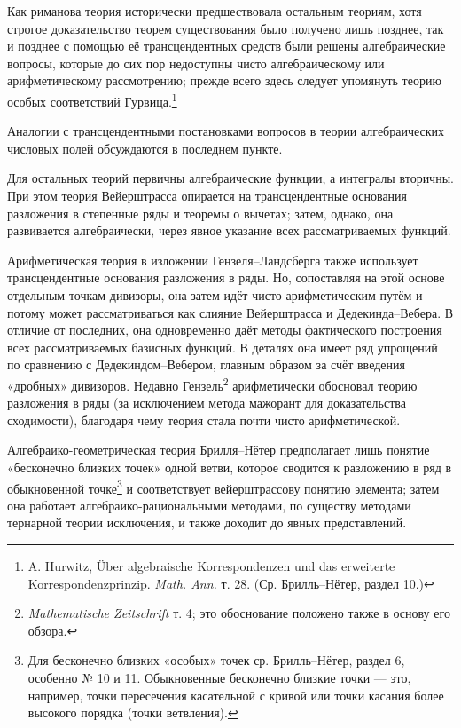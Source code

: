 \documentclass[11pt]{article}
\begin{document}
Как риманова теория исторически предшествовала остальным теориям, хотя строгое доказательство теорем существования было получено лишь позднее, так и позднее с помощью её трансцендентных средств были решены алгебраические вопросы, которые до сих пор недоступны чисто алгебраическому или арифметическому рассмотрению; прежде всего здесь следует упомянуть теорию особых соответствий Гурвица.\footnote{A. Hurwitz, Über algebraische Korrespondenzen und das erweiterte Korrespondenzprinzip. \emph{Math. Ann.} т. 28. (Ср. Брилль--Нётер, раздел 10.)}

Аналогии с трансцендентными постановками вопросов в теории алгебраических числовых полей обсуждаются в последнем пункте.

Для остальных теорий первичны алгебраические функции, а интегралы вторичны. При этом теория Вейерштрасса опирается на трансцендентные основания разложения в степенные ряды и теоремы о вычетах; затем, однако, она развивается алгебраически, через явное указание всех рассматриваемых функций.

Арифметическая теория в изложении Гензеля--Ландсберга также использует трансцендентные основания разложения в ряды. Но, сопоставляя на этой основе отдельным точкам дивизоры, она затем идёт чисто арифметическим путём и потому может рассматриваться как слияние Вейерштрасса и Дедекинда--Вебера. В отличие от последних, она одновременно даёт методы фактического построения всех рассматриваемых базисных функций. В деталях она имеет ряд упрощений по сравнению с Дедекиндом--Вебером, главным образом за счёт введения «дробных» дивизоров. Недавно Гензель\footnote{\emph{Mathematische Zeitschrift} т. 4; это обоснование положено также в основу его обзора.} арифметически обосновал теорию разложения в ряды (за исключением метода мажорант для доказательства сходимости), благодаря чему теория стала почти чисто арифметической.

Алгебраико-геометрическая теория Брилля--Нётер предполагает лишь понятие «бесконечно близких точек» одной ветви, которое сводится к разложению в ряд в обыкновенной точке\footnote{Для бесконечно близких «особых» точек ср. Брилль--Нётер, раздел 6, особенно № 10 и 11. Обыкновенные бесконечно близкие точки --- это, например, точки пересечения касательной с кривой или точки касания более высокого порядка (точки ветвления).} и соответствует вейерштрассову понятию элемента; затем она работает алгебраико-рациональными методами, по существу методами тернарной теории исключения, и также доходит до явных представлений.
\end{document}
